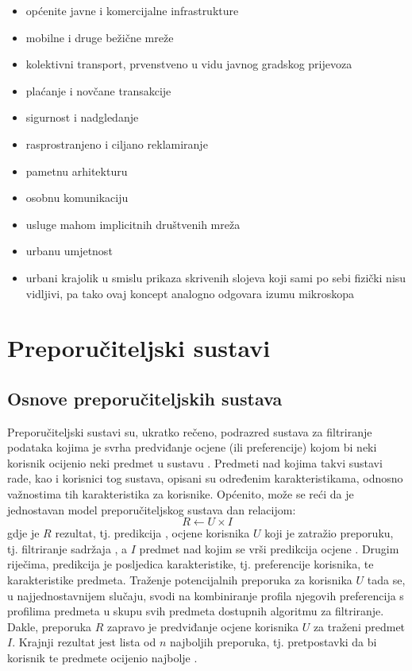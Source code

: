 \documentclass[times, utf8, diplomski, numeric]{fer}
\begin{document}
\begin{itemize}
  \item općenite javne i komercijalne infrastrukture
  \item mobilne i druge bežične mreže
  \item kolektivni transport, prvenstveno u vidu javnog gradskog prijevoza
  \item plaćanje i novčane transakcije
  \item sigurnost i nadgledanje
  \item rasprostranjeno i ciljano reklamiranje
  \item pametnu arhitekturu
  \item osobnu komunikaciju
  \item usluge mahom implicitnih društvenih mreža
  \item urbanu umjetnost
  \item urbani krajolik u smislu prikaza skrivenih slojeva koji sami po sebi
  fizički nisu vidljivi, pa tako ovaj koncept analogno odgovara izumu mikroskopa
\end{itemize}

\chapter{Preporučiteljski sustavi}
\section{Osnove preporučiteljskih sustava}
Preporučiteljski sustavi su, ukratko rečeno, podrazred sustava za filtriranje
podataka kojima je svrha predviđanje ocjene (ili preferencije) kojom bi neki
korisnik ocijenio neki predmet u sustavu \cite{RSHandbook}. Predmeti nad kojima
takvi sustavi rade, kao i korisnici tog sustava, opisani su određenim
karakteristikama, odnosno važnostima tih karakteristika za korisnike. Općenito,
može se reći da je jednostavan model preporučiteljskog sustava dan relacijom:
\begin{equation}
\label{eq:elementarniModel}
	R \leftarrow U \times I
\end{equation}
gdje je $R$ rezultat, tj. predikcija ,
ocjene korisnika $U$  koji je zatražio preporuku, tj. filtriranje
sadržaja , a $I$ predmet nad kojim se vrši predikcija ocjene .
Drugim riječima, predikcija je posljedica karakteristike, tj. preferencije
korisnika, te karakteristike predmeta. Traženje potencijalnih preporuka za
korisnika $U$ tada se, u najjednostavnijem slučaju, svodi na kombiniranje
profila njegovih preferencija s profilima predmeta u skupu svih predmeta dostupnih
algoritmu za filtriranje.
Dakle, preporuka $R$ zapravo je predviđanje ocjene korisnika $U$ za
traženi predmet $I$. Krajnji rezultat jest lista od $n$ najboljih preporuka, tj.
pretpostavki da bi korisnik te predmete ocijenio najbolje . 
\end{document}
